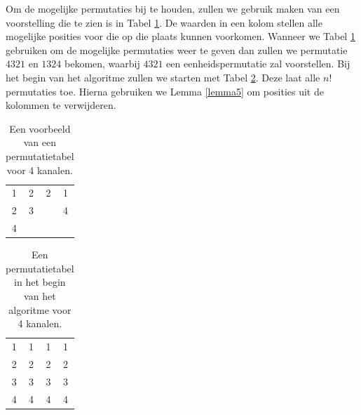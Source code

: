 \documentclass{article}
\begin{document}
Om de mogelijke permutaties bij te houden, zullen we gebruik maken van een voorstelling die te zien is in Tabel \ref{tabel4}.
De waarden in een kolom stellen alle mogelijke posities voor die op die plaats kunnen voorkomen.
Wanneer we Tabel  \ref{tabel4} gebruiken om de mogelijke permutaties weer te geven dan zullen we permutatie $4321$ en $1324$  bekomen, waarbij $4321$ een eenheidspermutatie zal voorstellen.
Bij het begin van het algoritme zullen we starten met Tabel \ref{tabel5}.
Deze laat alle $n!$ permutaties toe.
Hierna gebruiken we Lemma \ref{lemma5} om posities uit de kolommen te verwijderen.
\begin{table}[!h]
	\vspace{-5pt}
	\centering
	\begin{tabular}{|c|c|c|c|}
	\hline
	1 & 2 & 2 & 1 \\ 
	2 & 3 &  &  4\\ 
	4 &  &  &  \\ 
	\hline 
	\end{tabular}
	\caption{Een voorbeeld van een permutatietabel voor 4 kanalen.}
	\label{tabel4}
\end{table}
\begin{table}[!h]
	\vspace{-25pt}
	\centering
	\begin{tabular}{|c|c|c|c|}
	\hline
	1 & 1 & 1 & 1 \\ 
	2 & 2 & 2 & 2\\ 
	3 & 3 & 3 & 3 \\
	4 & 4 & 4 & 4\\ 
	\hline 
	\end{tabular}
	\caption{Een permutatietabel in het begin van het algoritme voor 4 kanalen.}
\label{tabel5}
\end{table}
\vspace{-5pt}
\end{document}
